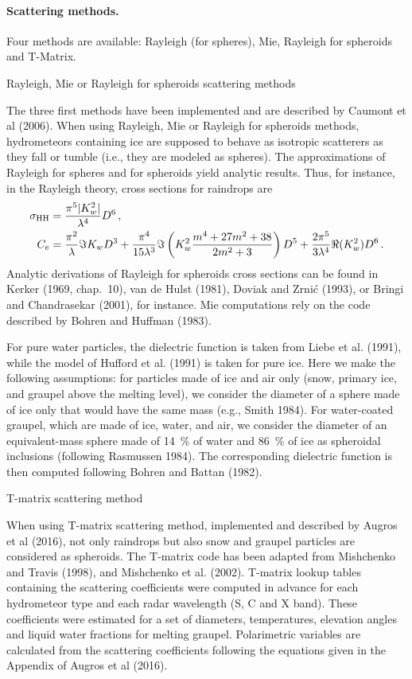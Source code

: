 \paragraph{Scattering methods.}
Four methods are available: Rayleigh (for spheres), Mie, Rayleigh for spheroids and T-Matrix.

\begin{description}
\item {Rayleigh, Mie or Rayleigh for spheroids scattering methods}
  
The three first methods have been implemented and are described by Caumont et al (2006). 
When using Rayleigh, Mie or Rayleigh for spheroids methods,
hydrometeors containing ice are supposed to behave as isotropic scatterers as they fall or tumble (i.e., they are modeled as spheres).
The approximations of Rayleigh for spheres and for spheroids yield analytic results. Thus, for instance, in the Rayleigh theory, cross sections for raindrops are
\begin{align}
\sigma_{\rm HH}&=\frac{\pi^5|K_w^2|}{\lambda^4}D^6\,,\\
C_e&=\frac{\pi^2}\lambda\Im K_wD^3+\frac{\pi^4}{15\lambda^3}\Im\left(K_w^2\frac{m^4+27m^2+38}{2m^2+3}\right)D^5+\frac{2\pi^5}{3\lambda^4}\Re(K_w^2)D^6\,.
\end{align}
Analytic derivations of Rayleigh for spheroids cross sections can be found in Kerker (1969, chap.~10), van de Hulst (1981), Doviak and Zrni\'c (1993), or Bringi and Chandrasekar (2001), for instance.
Mie computations rely on the code described by Bohren and Huffman (1983). 

For pure water particles, the dielectric function is taken from Liebe et al. (1991), while the model of Hufford et al. (1991) is taken for pure ice.  Here we make the following assumptions: for particles made of ice and air only (snow, primary ice, and graupel above the melting level), we consider the diameter of a sphere made of ice only that would have the same mass (e.g., Smith 1984). For water-coated graupel, which are made of ice, water, and air, we consider the diameter of an equivalent-mass sphere made of 14~\% of water and 86~\% of ice as spheroidal inclusions (following Rasmussen 1984). The corresponding dielectric function is then computed following Bohren and Battan (1982).

\item{T-matrix scattering method}

When using T-matrix scattering method, implemented and described by Augros et al (2016), not only raindrops but also snow and graupel particles are considered as spheroids. 
The T-matrix code has been adapted from Mishchenko and Travis (1998), and Mishchenko et al. (2002). T-matrix lookup tables
containing the scattering coefficients were computed in advance
for each hydrometeor type and each radar wavelength (S, C and
X band). These coefficients were estimated for a set of diameters,
temperatures, elevation angles and liquid water fractions for
melting graupel. Polarimetric variables are calculated from the scattering coefficients following the equations given in the Appendix of Augros et al (2016).


\end{description}
